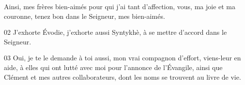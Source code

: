 Ainsi, mes frères bien-aimés pour qui j’ai tant d’affection, vous, ma joie et ma couronne, tenez bon dans le Seigneur, mes bien-aimés.

02 J’exhorte Évodie, j’exhorte aussi Syntykhè, à se mettre d’accord dans le Seigneur.

03 Oui, je te le demande à toi aussi, mon vrai compagnon d’effort, viens-leur en aide, à elles qui ont lutté avec moi pour l’annonce de l’Évangile, ainsi que Clément et mes autres collaborateurs, dont les noms se trouvent au livre de vie.
